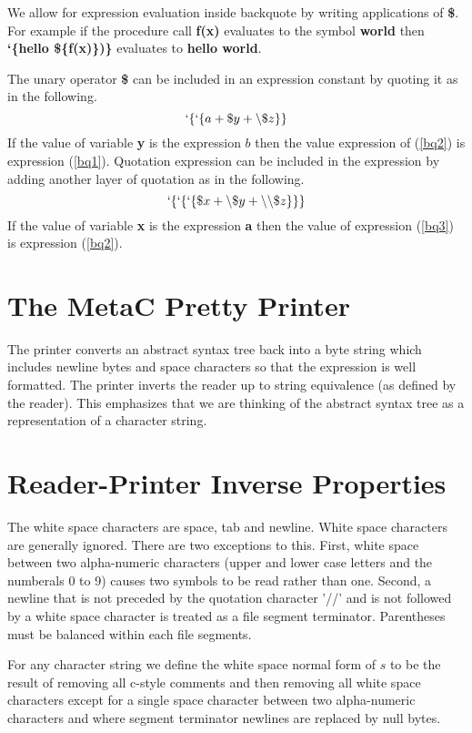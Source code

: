\documentclass{article}
\begin{document}
We allow for expression evaluation inside backquote by writing applications of {\bf \$}.  For example if the procedure call {\bf f(x)} evaluates to the symbol {\bf world} then
{\bf `\{hello \$\{f(x)\})\}} evaluates to {\bf hello world}.

The unary operator {\bf \$} can be included in an expression constant by quoting it as in the following.
\begin{equation}
\label{bq2}
`\{`\{a + \$y + \backslash\$z\}\}
\end{equation}
If the value of variable {\bf y} is the expression $b$ then the value expression of (\ref{bq2}) is expression (\ref{bq1}).
Quotation expression can be included in the expression by adding another layer of quotation as in the following.
\begin{equation}
\label{bq3}
`\{`\{`\{\$x + \backslash\$y + \backslash\backslash\$z\}\}\}
\end{equation}
If the value of variable {\bf x} is the expression {\bf a} then the value of expression (\ref{bq3}) is expression (\ref{bq2}).


\section{The MetaC Pretty Printer}

The printer converts an abstract syntax tree back into a byte string which includes newline bytes and space characters
so that the expression is well formatted. The printer inverts the reader up to string equivalence (as defined by the reader).
This emphasizes that we are thinking of the abstract syntax tree as a representation of a character string.

\section{Reader-Printer Inverse Properties}

The white space characters are space, tab and newline.  White space characters are generally ignored.  There are two exceptions to this.
First, white space between two alpha-numeric characters (upper and lower case letters and the numberals 0 to 9) causes two symbols to be read rather than one.
Second, a newline that is not preceded by the quotation character '//' and is not followed by a white space character is
treated as a file segment terminator.  Parentheses must be balanced within each file segments.

For any character string we define the white space normal form of $s$
to be the result of removing all c-style comments and then removing all white space characters except for
a single space character between two alpha-numeric characters and where segment terminator newlines
are replaced by null bytes.
\end{document}

